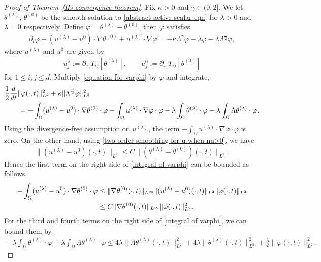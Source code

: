 \documentclass[reqno]{amsart}%
\theoremstyle{definition}
\theoremstyle{remark}
\numberwithin{equation}{section}
\newcommand{\dis}{\displaystyle}
\newcommand{\1}{\mathbf{1}}
\newcommand{\intox}{\int_{\Omega}}
\numberwithin{equation}{section}
\numberwithin{theorem}{section}
\numberwithin{figure}{section}
\begin{document}
\begin{proof}[Proof of Theorem~\ref{Hs convergence theorem}]
Fix $\kappa>0$ and $\gamma\in(0,2]$. We let $\theta^{(\lambda)}$, $\theta^{(0)}$ be the smooth solution to \eqref{abstract active scalar eqn} for $\lambda>0$ and $\lambda=0$ respectively. Define $\varphi=\theta^{(\lambda)}-\theta^{(0)}$, then $\varphi$ satisfies
\begin{align}\label{equation for varphi}
\partial_t\varphi+(u^{(\lambda)}-u^0)\cdot\nabla\theta^{(0)}+u^{(\lambda)}\cdot\nabla\varphi=-\kappa\Lambda^{\gamma}\varphi-\lambda\varphi-\lambda\Lambda^\frac{1}{2}\varphi,
\end{align}
where $u^{(\lambda)}$ and $u^0$ are given by
\begin{align*}
u_j^\lambda:=\partial_{x_i} T_{ij}[\theta^{(\lambda)}],\qquad u_j^0:=\partial_{x_i} T_{ij}[\theta^{(0)}]
\end{align*}
for $1\le i,j\le d$. Multiply \eqref{equation for varphi} by $\varphi$ and integrate,
\begin{align}\label{integral of varphi}
&\frac{1}{2}\frac{d}{dt}\|\varphi(\cdot,t)\|^2_{L^2}+\kappa\|\Lambda^{\frac{\gamma}{2}}\varphi\|^2_{L^2}\notag\\
&\qquad=-\int_{\Omega}(u^{(\lambda)}-u^0)\cdot\nabla\theta^{(0)}\cdot\varphi-\int_{\Omega}u^{(\lambda)}\cdot\nabla\varphi\cdot\varphi-\lambda\int_{\Omega}\theta^{(\lambda)}\cdot\varphi-\lambda\int_{\Omega}\Lambda\theta^{(\lambda)}\cdot\varphi.
\end{align}
Using the divergence-free assumption on $u^{(\lambda)}$, the term $\dis-\int_{\Omega}u^{(\lambda)}\cdot\nabla\varphi\cdot\varphi$ is zero. On the other hand, using \eqref{two order smoothing for u when nu>0}, we have
\begin{equation*}
\|(u^{(\lambda)}-u^0)(\cdot,t)\|_{L^2}\le C\|(\theta^{(\lambda)}-\theta^{(0)})(\cdot,t)\|_{L^2}.
\end{equation*}
Hence the first term on the right side of \eqref{integral of varphi} can be bounded as follows.
\begin{align*}
-\intox(u^{(\lambda)}-u^0)\cdot\nabla\theta^{(0)}\cdot\varphi&\le\|\nabla\theta^{(0)}(\cdot,t)\|_{L^\infty}\|(u^{(\lambda)}-u^0)(\cdot,t)\|_{L^2}\|\varphi(\cdot,t)\|_{L^2}\notag\\
&\le C\|\nabla\theta^{(0)}(\cdot,t)\|_{L^\infty}\|\varphi(\cdot,t)\|_{L^2}^2.
\end{align*}
For the third and fourth terms on the right side of \eqref{integral of varphi}, we can bound them by
\begin{align*}
-\lambda\int_{\Omega}\theta^{(\lambda)}\cdot\varphi-\lambda\int_{\Omega}\Lambda\theta^{(\lambda)}\cdot\varphi\le4\lambda\|\Lambda\theta^{(\lambda)}(\cdot,t)\|^2_{L^2}+4\lambda\|\theta^{(\lambda)}(\cdot,t)\|^2_{L^2}+\frac{\lambda}{2}\|\varphi(\cdot,t)\|^2_{L^2}.

\end{align*}
\end{proof}
\end{document}
